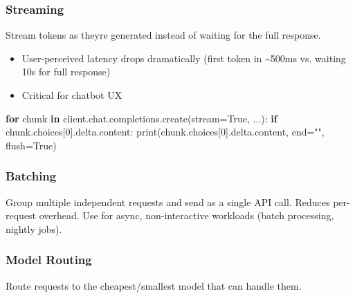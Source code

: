 \documentclass[11pt]{article}
\providecommand{\tightlist}{\setlength{\itemsep}{1pt}\setlength{\parskip}{0pt}}
\newenvironment{Shaded}{\begin{snugshade}}{\end{snugshade}}
\newcommand{\BuiltInTok}[1]{\textcolor[rgb]{0.50,0.55,0.55}{#1}}
\newcommand{\ControlFlowTok}[1]{\textcolor[rgb]{0.99,0.74,0.29}{\textbf{#1}}}
\newcommand{\DecValTok}[1]{\textcolor[rgb]{0.96,0.45,0.00}{#1}}
\newcommand{\KeywordTok}[1]{\textcolor[rgb]{0.81,0.81,0.76}{\textbf{#1}}}
\newcommand{\NormalTok}[1]{\textcolor[rgb]{0.81,0.81,0.76}{#1}}
\newcommand{\OperatorTok}[1]{\textcolor[rgb]{0.81,0.81,0.76}{#1}}
\newcommand{\StringTok}[1]{\textcolor[rgb]{0.96,0.31,0.31}{#1}}
\newcommand{\VariableTok}[1]{\textcolor[rgb]{0.15,0.68,0.68}{#1}}
\begin{document}
\subsubsection{Streaming}\label{streaming}

Stream tokens as they\textquotesingle re generated instead of waiting for the full response.

\begin{itemize}
\tightlist
\item
  User-perceived latency drops dramatically (first token in \textasciitilde500ms vs. waiting 10s for full response)
\item
  Critical for chatbot UX
\end{itemize}


\begin{Shaded}
\begin{Highlighting}[]
\ControlFlowTok{for}\NormalTok{ chunk }\KeywordTok{in}\NormalTok{ client.chat.completions.create(stream}\OperatorTok{=}\VariableTok{True}\NormalTok{, ...):}
    \ControlFlowTok{if}\NormalTok{ chunk.choices[}\DecValTok{0}\NormalTok{].delta.content:}
        \BuiltInTok{print}\NormalTok{(chunk.choices[}\DecValTok{0}\NormalTok{].delta.content, end}\OperatorTok{=}\StringTok{""}\NormalTok{, flush}\OperatorTok{=}\VariableTok{True}\NormalTok{)}
\end{Highlighting}
\end{Shaded}

\subsubsection{Batching}\label{batching}

Group multiple independent requests and send as a single API call. Reduces per-request overhead. Use for async, non-interactive workloads (batch processing, nightly jobs).

\subsubsection{Model Routing}\label{model-routing}

Route requests to the cheapest/smallest model that can handle them.

\end{document}
